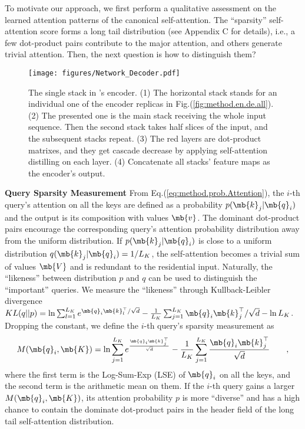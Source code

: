 To motivate our approach, we first perform a qualitative assessment on the learned attention patterns of the canonical self-attention. The ``sparsity'' self-attention score forms a long tail distribution (see Appendix C for details), i.e., a few dot-product pairs contribute to the major attention, and others generate trivial attention. Then, the next question is how to distinguish them?

\begin{figure*}[t]
  \centering
  \texttt{[image: figures/Network\_Decoder.pdf]}
  \caption{The single stack in \mn's encoder. (1) The horizontal stack stands for an individual one of the encoder replicas in Fig.(\ref{fig:method.en.de.all}). (2) The presented one is the main stack receiving the whole input sequence. Then the second stack takes half slices of the input, and the subsequent stacks repeat. (3) The red layers are dot-product matrixes, and they get cascade decrease by applying self-attention distilling on each layer. (4) Concatenate all stacks' feature maps as the encoder's output.}
  \label{fig:method.encoder}
\end{figure*}

\textbf{Query Sparsity Measurement}
From Eq.(\ref{eq:method.prob.Attention}), the $i$-th query's attention on all the keys are defined as a probability $p(\mb{k}_j|\mb{q}_i)$ and the output is its composition with values $\mb{v}$. The dominant dot-product pairs encourage the corresponding query's attention probability distribution away from the uniform distribution. If $p(\mb{k}_j|\mb{q}_i)$ is close to a uniform distribution $q(\mb{k}_j|\mb{q}_i)={1}/{L_{K}}$, the self-attention becomes a trivial sum of values $\mb{V}$ and is redundant to the residential input. Naturally, the ``likeness'' between distribution $p$ and $q$ can be used to distinguish the ``important'' queries. We measure the ``likeness'' through Kullback-Leibler divergence
$ KL (q||p) = \ln \sum_{l=1}^{L_K} e^{{\mb{q}_i\mb{k}_l^{\top}}/{\sqrt{d}}} - \frac{1}{L_K} \sum_{j=1}^{L_K} {\mb{q}_i\mb{k}_j^{\top}}/{\sqrt{d}} - \ln L_K $.
Dropping the constant, we define the $i$-th query's sparsity measurement as
\begin{equation}
\label{eq.method.measure}
    M (\mb{q}_i, \mb{K}) = \ln \sum_{j=1}^{L_K} e^{\frac{\mb{q}_i\mb{k}_j^{\top}}{\sqrt{d}}} - \frac{1}{L_K} \sum_{j=1}^{L_K} \frac{\mb{q}_i\mb{k}_j^{\top}}{\sqrt{d}} \qquad,
\end{equation}
where the first term is the Log-Sum-Exp (LSE) of $\mb{q}_i$ on all the keys, and the second term is the arithmetic mean on them. If the $i$-th query gains a larger $M(\mb{q}_i, \mb{K})$, its attention probability $p$ is more ``diverse'' and has a high chance to contain the dominate dot-product pairs in the header field of the long tail self-attention distribution.


